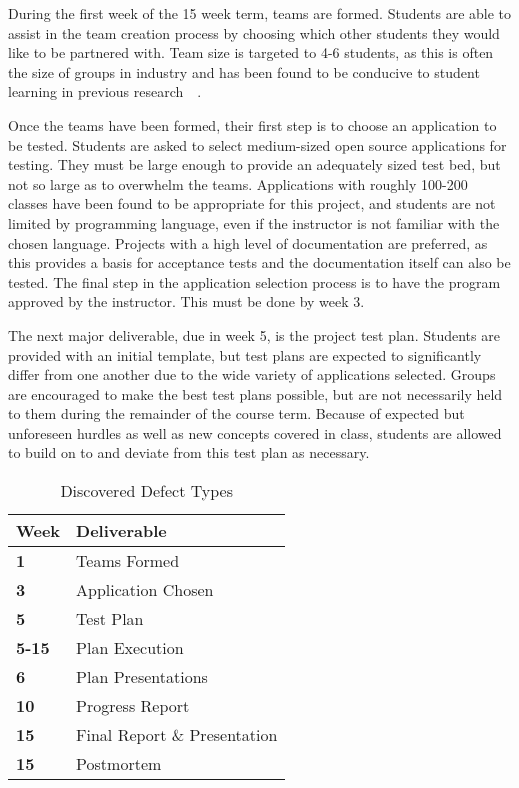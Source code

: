 \documentclass{sig-alternate}
\begin{document}
During the first week of the 15 week term, teams are formed. Students are able to assist in the team creation process by choosing which other students they would like to be partnered with. Team size is targeted to 4-6 students, as this is often the size of groups in industry and has been found to be conducive to student learning in previous research~\cite{Guo:2009:GPS:1516546.1516579}~\cite{Petkovic:2006:TPS:1140123.1140202}.

Once the teams have been formed, their first step is to choose an application to be tested. Students are asked to select medium-sized open source applications for testing. They must be large enough to provide an adequately sized test bed, but not so large as to overwhelm the teams. Applications with roughly 100-200 classes have been found to be appropriate for this project, and students are not limited by programming language, even if the instructor is not familiar with the chosen language. Projects with a high level of documentation are preferred, as this provides a basis for acceptance tests and the documentation itself can also be tested. The final step in the application selection process is to have the program approved by the instructor. This must be done by week 3.

The next major deliverable, due in week 5, is the project test plan. Students are provided with an initial template, but test plans are expected to significantly differ from one another due to the wide variety of applications selected. Groups are encouraged to make the best test plans possible, but are not necessarily held to them during the remainder of the course term. Because of expected but unforeseen hurdles as well as new concepts covered in class, students are allowed to build on to and deviate from this test plan as necessary.

\begin{table}[h!]
\caption{Discovered Defect Types}
\begin{center}
    \begin{tabular}{ l | l }
    \toprule

	\bfseries Week & \bfseries Deliverable  \\ \hline \hline
	\bfseries 1 & Teams Formed \\ \hline
	\bfseries 3 & Application Chosen \\ \hline
	\bfseries 5 & Test Plan  \\ \hline
	\bfseries 5-15 & Plan Execution \\ \hline	
	\bfseries 6 & Plan Presentations  \\ \hline
	\bfseries 10 & Progress Report \\ \hline
	\bfseries 15 & Final Report \& Presentation \\ \hline
	\bfseries 15 & Postmortem \\ \hline

    \end{tabular}
\end{center}

\label{table:discovereddefecttypes}
\end{table}
\end{document}
